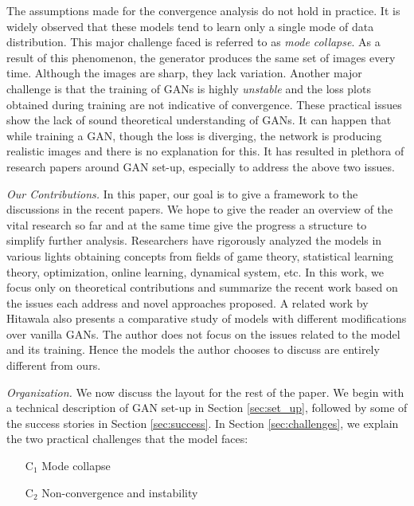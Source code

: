 The assumptions made for the convergence analysis do not hold in practice. It is widely observed that these models tend to learn only a single mode of data distribution. This major challenge faced is referred to as \emph{mode collapse}. As a result of this phenomenon, the generator produces the same set of images every time. Although the images are sharp, they lack variation. Another major challenge is that the training of GANs is highly \emph{unstable} and the loss plots obtained during training are not indicative of convergence. These practical issues show the lack of sound theoretical understanding of GANs. It can happen that while training a GAN, though the loss is diverging, the network is producing realistic images and there is no explanation for this. It has resulted in plethora of research papers around GAN set-up, especially to address the above two issues. %


\bigskip
\noindent\emph{Our Contributions.} In this paper, our goal is to give a framework to the discussions in the  recent papers.  We hope to give the reader an overview of the vital research so far and at the same time give the progress a structure to simplify further analysis. Researchers have rigorously analyzed the models in various lights obtaining concepts from fields of game theory, statistical learning theory, optimization, online learning, dynamical system, etc. In this work, we focus only on theoretical contributions and summarize the recent work based on the issues each address and novel approaches proposed. A related work by Hitawala \citep{hitawala} also presents a comparative study of models with different modifications over vanilla GANs. The author does not focus on the issues related to the model and its training. Hence the models the author chooses to discuss are entirely different from ours. 

\bigskip
\noindent\emph{Organization.} We now discuss the layout for the rest of the paper. We begin with a technical description of GAN set-up in Section \ref{sec:set_up}, followed by some of the success stories in Section \ref{sec:success}. In Section \ref{sec:challenges}, we explain the two practical challenges that the model faces: 

\bigskip
\begin{tcolorbox}[colback=gray!10!white,colframe=black!75!black]
\begin{itemize}
    \item[C$_1$] Mode collapse
    \item[C$_2$] Non-convergence and instability
\end{itemize}
\end{tcolorbox}

